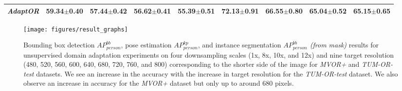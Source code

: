 \begin{table*}[t]
{\begin{tabular}{l|cccc|cccc}
			\emph{\textbf{AdaptOR}}  & \textbf{59.34$\pm$0.40}                                                                               & \textbf{57.44$\pm$0.42}                                         & \textbf{56.62$\pm$0.41} & \textbf{55.39$\pm$0.51} & \textbf{72.13$\pm$0.91} & \textbf{66.55$\pm$0.80} & \textbf{65.04$\pm$0.52} & \textbf{65.15$\pm$0.65} \Tstrut \\
			\hline
			\bottomrule
		\end{tabular}
	}
	\label{table:source-target-da}
	\vspace{-1mm}
\end{table*}

\begin{figure*}[htb!]
	\texttt{[image: figures/result\_graphs]}
	\caption{\small{Bounding box detection \emph{$AP_{person}^{bb}$}, pose estimation \emph{$AP_{person}^{kp}$}, and instance segmentation \emph{$AP_{person}^{bb}$ (from mask)} results for unsupervised domain adaptation experiments on four downsampling scales (1x, 8x, 10x, and 12x) and nine target resolution (480, 520, 560, 600, 640, 680, 720, 760, and 800) corresponding to the shorter side of the image for \emph{MVOR+} and \emph{TUM-OR-test} datasets. We see an increase in the accuracy with the increase in target resolution for the \emph{TUM-OR-test} dataset.  We also observe an increase in accuracy for the \emph{MVOR+} dataset but only up to around 680 pixels.}}
	\label{fig:results_graphs}
\end{figure*}
